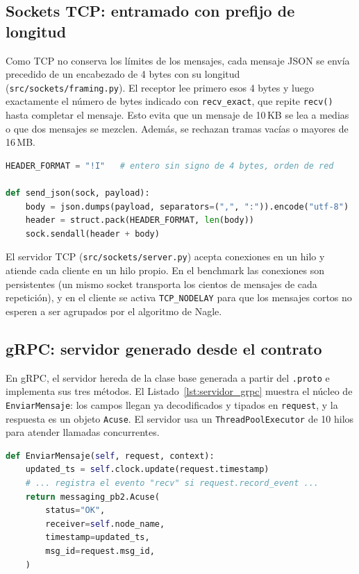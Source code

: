 \documentclass[12pt,a4paper]{article}
\begin{document}
\subsection{Sockets TCP: entramado con prefijo de longitud}

Como TCP no conserva los límites de los mensajes, cada mensaje JSON se envía precedido de un encabezado de 4 bytes con su longitud (\texttt{src/sockets/framing.py}). El receptor lee primero esos 4 bytes y luego exactamente el número de bytes indicado con \texttt{recv\_exact}, que repite \texttt{recv()} hasta completar el mensaje. Esto evita que un mensaje de 10\,KB se lea a medias o que dos mensajes se mezclen. Además, se rechazan tramas vacías o mayores de 16\,MB.

\begin{lstlisting}[language=Python, caption={Envío con prefijo de longitud en \texttt{src/sockets/framing.py}.}, label={lst:framing}]
HEADER_FORMAT = "!I"   # entero sin signo de 4 bytes, orden de red

def send_json(sock, payload):
    body = json.dumps(payload, separators=(",", ":")).encode("utf-8")
    header = struct.pack(HEADER_FORMAT, len(body))
    sock.sendall(header + body)
\end{lstlisting}

El servidor TCP (\texttt{src/sockets/server.py}) acepta conexiones en un hilo y atiende cada cliente en un hilo propio. En el benchmark las conexiones son persistentes (un mismo socket transporta los cientos de mensajes de cada repetición), y en el cliente se activa \texttt{TCP\_NODELAY} para que los mensajes cortos no esperen a ser agrupados por el algoritmo de Nagle.

\subsection{gRPC: servidor generado desde el contrato}

En gRPC, el servidor hereda de la clase base generada a partir del \texttt{.proto} e implementa sus tres métodos. El Listado~\ref{lst:servidor_grpc} muestra el núcleo de \texttt{EnviarMensaje}: los campos llegan ya decodificados y tipados en \texttt{request}, y la respuesta es un objeto \texttt{Acuse}. El servidor usa un \texttt{ThreadPoolExecutor} de 10 hilos para atender llamadas concurrentes.

\begin{lstlisting}[language=Python, caption={Núcleo de \texttt{EnviarMensaje} en \texttt{src/grpc/server\_grpc.py}.}, label={lst:servidor_grpc}]
def EnviarMensaje(self, request, context):
    updated_ts = self.clock.update(request.timestamp)
    # ... registra el evento "recv" si request.record_event ...
    return messaging_pb2.Acuse(
        status="OK",
        receiver=self.node_name,
        timestamp=updated_ts,
        msg_id=request.msg_id,
    )
\end{lstlisting}
\end{document}

